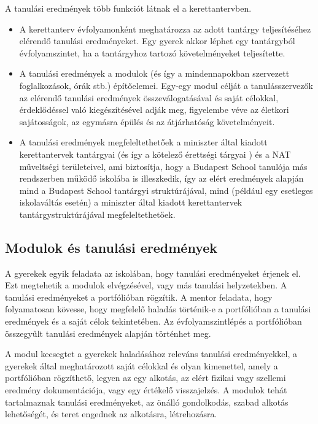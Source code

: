 A tanulási eredmények több funkciót látnak el a kerettantervben.

\begin{itemize}

      \item A kerettanterv évfolyamonként meghatározza az adott tantárgy teljesítéséhez elérendő tanulási eredményeket. Egy gyerek akkor  léphet egy tantárgyból évfolyamszintet, ha a tantárgyhoz tartozó követelményeket teljesítette.

      \item A tanulási eredmények a modulok (és így a mindennapokban szervezett foglalkozások, órák stb.) építőelemei. Egy-egy modul célját a  tanulásszervezők az elérendő tanulási eredmények	összeválogatásával és saját célokkal, érdeklődéssel való	kiegészítésével adják meg, figyelembe véve az életkori  sajátosságok, az egymásra épülés és az átjárhatóság  követelményeit.
      \item A tanulási eredmények megfeleltethetőek a miniszter által kiadott kerettantervek tantárgyai (és így a kötelező érettségi tárgyai )  és a NAT műveltségi területeivel, ami biztosítja, hogy a Budapest  School tanulója más rendszerben működő iskolába is illeszkedik, így az	elért eredmények alapján mind a Budapest School tantárgyi  struktúrájával, mind (például egy esetleges iskolaváltás esetén) a	miniszter által kiadott kerettantervek tantárgystruktúrájával megfeleltethetőek.
\end{itemize}

\subsection{Modulok és tanulási eredmények}
\label{sec:modulok_es_tanulasi_eredmenyek}
A gyerekek egyik feladata az iskolában, hogy tanulási eredményeket érjenek el. Ezt megtehetik a modulok elvégzésével, vagy más tanulási helyzetekben. A tanulási eredményeket a portfólióban rögzítik. A mentor feladata, hogy folyamatosan kövesse, hogy megfelelő haladás történik-e a portfólióban a tanulási eredmények és a saját célok tekintetében. Az évfolyamszintlépés a portfólióban összegyűlt tanulási eredmények alapján történhet meg.

A modul kecsegtet a gyerekek haladásához releváns tanulási eredményekkel, a gyerekek által meghatározott saját célokkal és olyan kimenettel, amely a portfólióban rögzíthető, legyen az egy alkotás, az elért fizikai vagy szellemi eredmény dokumentációja, vagy egy értékelő visszajelzés. A modulok tehát tartalmaznak tanulási eredményeket, az önálló gondolkodás, szabad alkotás lehetőségét, és teret engednek az alkotásra, létrehozásra.

